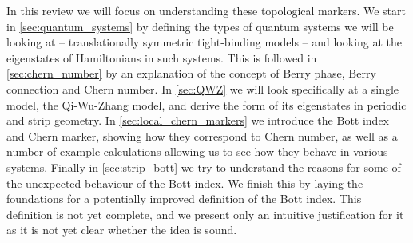 In this review we will focus on understanding these topological markers. We start in \textsection\ref{sec:quantum_systems} by defining the types of quantum systems we will be looking at -- translationally symmetric tight-binding models -- and looking at the eigenstates of Hamiltonians in such systems. This is followed in \textsection\ref{sec:chern_number} by an explanation of the concept of Berry phase, Berry connection and Chern number. In \textsection\ref{sec:QWZ} we will look specifically at a single model, the Qi-Wu-Zhang model, and derive the form of its eigenstates in periodic and strip geometry. In \textsection\ref{sec:local_chern_markers} we introduce the Bott index and Chern marker, showing how they correspond to Chern number, as well as a number of example calculations allowing us to see how they behave in various systems. Finally in \textsection\ref{sec:strip_bott} we try to understand the reasons for some of the unexpected behaviour of the Bott index. We finish this by laying the foundations for a potentially improved definition of the Bott index. This definition is not yet complete, and we present only an intuitive justification for it as it is not yet clear whether the idea is sound.